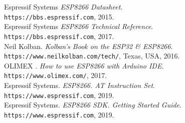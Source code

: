 \begin{thebibliography}{1}
    Espressif Systems 
    \textit{ESP8266 Datasheet}.\\
    \texttt{https://bbs.espressif.com}, 2015.\\

    Espressif Systems
    \textit{ESP8266 Technical Reference}.\\
    \texttt{https://bbs.espressif.com}, 2017.\\

    Neil Kolban.
    \textit{Kolban's Book on the ESP32 \& ESP8266}. \\
    \texttt{https://www.neilkolban.com/tech/}, Texas, USA, 2016.\\

    OLIMEX \textsuperscript{\textcopyright}.
    \textit{How to use ESP8266 with Arduino IDE}.\\
    \texttt{https://www.olimex.com/}, 2017.\\

    Espressif Systems.
    \textit{ESP8266. AT Instruction Set}.\\
    \texttt{https://www.espressif.com}, 2019.\\

    Espressif Systems.
    \textit{ESP8266 SDK. Getting Started Guide}.\\
    \texttt{https://www.espressif.com}, 2019.\\

\end{thebibliography}
